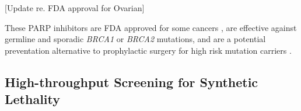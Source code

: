 [Update re. FDA approval for Ovarian]

These PARP inhibitors are FDA approved for some cancers \cite{McLachlan2016}, are effective against germline and sporadic \textit{BRCA1} or \textit{BRCA2} mutations, and are a potential preventation alternative to prophylactic surgery for high risk mutation carriers \cite{Strom2012}.


\subsection[High{}-throughput Screening for Synthetic Lethality]{High-throughput Screening for Synthetic Lethality}




